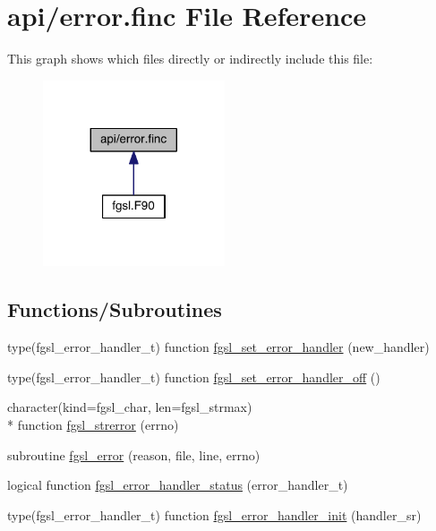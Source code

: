 \hypertarget{error_8finc}{\section{api/error.finc File Reference}
\label{error_8finc}
}
This graph shows which files directly or indirectly include this file\-:\nopagebreak
\begin{figure}[H]
\begin{center}
\leavevmode
\includegraphics[width=152pt]{error_8finc__dep__incl}
\end{center}
\end{figure}
\subsection*{Functions/\-Subroutines}
\begin{DoxyCompactItemize}
\item 
type(fgsl\-\_\-error\-\_\-handler\-\_\-t) function \hyperlink{error_8finc_a0bcea44cb57ec40ff8ee5deb56628d6c}{fgsl\-\_\-set\-\_\-error\-\_\-handler} (new\-\_\-handler)
\item 
type(fgsl\-\_\-error\-\_\-handler\-\_\-t) function \hyperlink{error_8finc_a038022a5ae74d2221231fb2d484e3fb9}{fgsl\-\_\-set\-\_\-error\-\_\-handler\-\_\-off} ()
\item 
character(kind=fgsl\-\_\-char, len=fgsl\-\_\-strmax) \\*
function \hyperlink{error_8finc_afb379d7136f115fcbc5fbe6178ab1a8b}{fgsl\-\_\-strerror} (errno)
\item 
subroutine \hyperlink{error_8finc_a4d5b557021a59a337ae0a724da2f2f79}{fgsl\-\_\-error} (reason, file, line, errno)
\item 
logical function \hyperlink{error_8finc_aa355a6ea584a0315b6bd48125143f61e}{fgsl\-\_\-error\-\_\-handler\-\_\-status} (error\-\_\-handler\-\_\-t)
\item 
type(fgsl\-\_\-error\-\_\-handler\-\_\-t) function \hyperlink{error_8finc_a2021475812bde99b19e3497120fe502f}{fgsl\-\_\-error\-\_\-handler\-\_\-init} (handler\-\_\-sr)
\end{DoxyCompactItemize}


